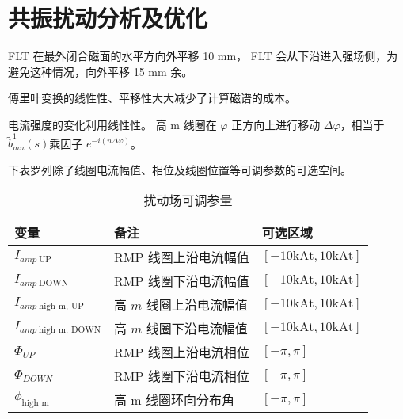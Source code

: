 \section{共振扰动分析及优化}
FLT 在最外闭合磁面的水平方向外平移 10 mm， FLT 会从下沿进入强场侧，为避免这种情况，向外平移 15 mm 余。
\begin{figure}[t]
  \centering

  \hfill
\end{figure}

  傅里叶变换的线性性、平移性大大减少了计算磁谱的成本。

  电流强度的变化利用线性性。
  高 m 线圈在 $\varphi$ 正方向上进行移动 $\Delta \varphi$，相当于$\tilde{b}_{m n}^{1}(s)$乘因子 $e^{-i\left(n \Delta\varphi \right )}$。

  下表罗列除了线圈电流幅值、相位及线圈位置等可调参数的可选空间。

  
\begin{table}[htb]
  \centering
  \caption{扰动场可调参量}
  \label{tab:east_parameter}
  \begin{tabularx}{\linewidth}{lXX}
      \toprule[1.5pt]
      变量 & 备注 & 可选区域 \\
      \midrule[1pt]
      $I_{amp~\text{UP}}$ & RMP 线圈上沿电流幅值 & $[-10 \text{kAt}, 10 \text{kAt}]$\\ 
      $I_{amp~\text{DOWN}}$ & RMP 线圈下沿电流幅值 & $[-10 \text{kAt}, 10 \text{kAt}]$\\ 
      $I_{amp~\text{high m, UP}}$ & 高 $m$ 线圈上沿电流幅值 & $[-10 \text{kAt}, 10 \text{kAt}]$\\
      $I_{amp~\text{high m, DOWN}}$ & 高 $m$ 线圈下沿电流幅值 & $[-10 \text{kAt}, 10 \text{kAt}]$\\
      $\Phi_{UP}$ & RMP 线圈上沿电流相位 & $[-\pi, \pi]$\\
      $\Phi_{DOWN}$ & RMP 线圈下沿电流相位 & $[-\pi, \pi]$\\
      $\phi_{\text{high m}}$ & 高 m 线圈环向分布角 & $[-\pi, \pi]$\\
      \bottomrule[1.5pt]
  \end{tabularx}
\end{table}
  

